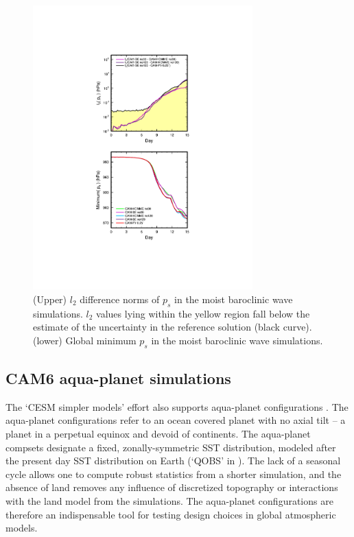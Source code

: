 \documentclass{agujournal}
\begin{document}
\begin{figure}[h]
\centering
\includegraphics[width=20pc]{figs/l2.pdf}
\caption{(Upper) $l_2$ difference norms of $p_s$ in the moist baroclinic wave simulations. $l_2$ values lying within the yellow region fall below the estimate of the uncertainty in the reference solution (black curve). (lower) Global minimum $p_s$ in the moist baroclinic wave simulations.}
\label{fig:l2norm}
\end{figure}

\subsection{CAM6 aqua-planet simulations}\label{sec:APE}
The `CESM simpler models' effort also supports aqua-planet configurations \citep{MWO2016JAMES}. The aqua-planet configurations \citep{NH2000ASL} refer to an ocean covered planet with no axial tilt -- a planet in a perpetual equinox and devoid of continents. The aqua-planet compsets designate a fixed, zonally-symmetric SST distribution, modeled after the present day SST distribution on Earth (`QOBS' in \cite{NH2000ASL}). The lack of a seasonal cycle allows one to compute robust statistics from a shorter simulation, and the absence of land removes any influence of discretized topography or interactions with the land model from the simulations. The aqua-planet configurations are therefore an indispensable tool for testing design choices in global atmospheric models.
\end{document}
